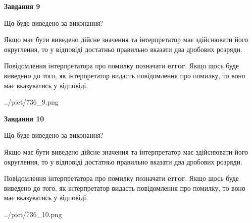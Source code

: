 \documentclass[12pt, ukrainian]{article}
\begin{document}
{\begin {Large}
{\begin {center}\textbf{Завдання 9}\end {center}}\par
Що буде виведено за виконання? \par

Якщо має бути виведено дійсне значення та інтерпретатор має здійснювати його округлення, 
то у відповіді достатньо правильно вказати два дробових розряди.

Повідомлення інтерпретатора про помилку позначати \textbf{error}.
Якщо щось буде виведено до того, як інтерпретатор видасть повідомлення про помилку, 
то воно має вказуватись у відповіді. \par

\begin{center}
	{../pict/736_9.png}
\end{center}
\newpage

{\begin {center}\textbf{Завдання 10}\end {center}}\par
Що буде виведено за виконання? \par

Якщо має бути виведено дійсне значення та інтерпретатор має здійснювати його округлення, 
то у відповіді достатньо правильно вказати два дробових розряди.

Повідомлення інтерпретатора про помилку позначати \textbf{error}.
Якщо щось буде виведено до того, як інтерпретатор видасть повідомлення про помилку, 
то воно має вказуватись у відповіді. \par

\begin{center}
	{../pict/736_10.png}
\end{center}
\newpage

\end {Large}}
\end{document}
